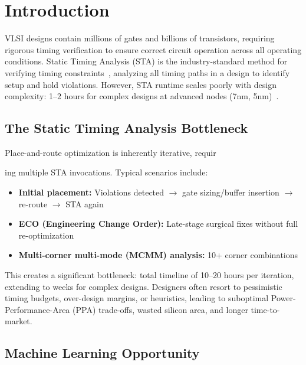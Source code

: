 \documentclass[10pt,twocolumn,journal]{IEEEtran}
\begin{document}
\section{Introduction}
\label{sec:intro}

 VLSI designs contain millions of gates and billions of transistors, requiring rigorous timing verification to ensure correct circuit operation across all operating conditions. Static Timing Analysis (STA) is the industry-standard method for verifying timing constraints~\cite{opensta}, analyzing all timing paths in a design to identify setup and hold violations. However, STA runtime scales poorly with design complexity: 1--2 hours for complex designs at advanced nodes (7nm, 5nm)~\cite{guo2022timingpredict}.

\subsection{The Static Timing Analysis Bottleneck}

Place-and-route optimization is inherently iterative, requir

ing multiple STA invocations. Typical scenarios include:
\begin{itemize}
    \item \textbf{Initial placement:} Violations detected $\rightarrow$ gate sizing/buffer insertion $\rightarrow$ re-route $\rightarrow$ STA again
    \item \textbf{ECO (Engineering Change Order):} Late-stage surgical fixes without full re-optimization
    \item \textbf{Multi-corner multi-mode (MCMM) analysis:} 10+ corner combinations
\end{itemize}

This creates a significant bottleneck: total timeline of 10--20 hours per iteration, extending to weeks for complex designs. Designers often resort to pessimistic timing budgets, over-design margins, or heuristics, leading to suboptimal Power-Performance-Area (PPA) trade-offs, wasted silicon area, and longer time-to-market.

\subsection{Machine Learning Opportunity}
\end{document}
